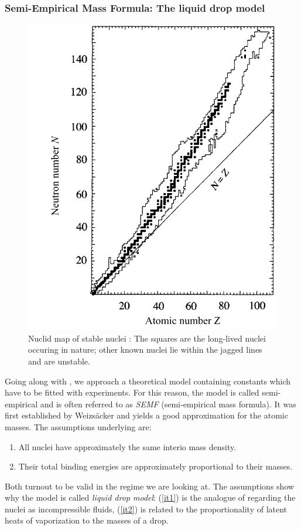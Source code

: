 \subsubsection{Semi-Empirical Mass Formula: The liquid drop model}
\begin{figure}[htpb]
    \centering
    \includegraphics[width=0.6\linewidth]{figures/nuclidmap}
    \caption{Nuclid map of stable nuclei \cite{Hooshyar}: The squares are the long-lived nuclei
    occuring in nature; other known nuclei lie within the jagged lines and are unstable.}
    \label{fig:nuclidmap}
\end{figure}
\label{ssub:Semi-Empirical Mass Formula: The Liquid Drop Model}
Going along with  \cite{Hooshyar}, we approach a theoretical model containing constants which
have to be fitted with experiments. For this reason, the model is called semi-empirical and 
is often referred to as \emph{SEMF} (semi-empirical mass formula).
It was first established by Weizsäcker and yields a 
good approximation for the atomic masses. The assumptions underlying are:
\begin{enumerate}
    \item All nuclei have approximately the same interio mass density.
        \label{it1}
    \item Their total binding energies are approximately proportional to their masses.
        \label{it2}
\end{enumerate}
Both turnout to be valid in the regime we are looking at.
The assumptions show why the model is called \emph{liquid drop model}: 
(\ref{it1}) is the analogue of regarding the nuclei as incompressible fluids, 
(\ref{it2}) is related to the proportionality of latent heats of vaporization to the masses of a drop. 
